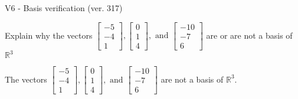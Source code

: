 \begin{exercise}
  \begin{exerciseTitle}V6 - Basis verification (ver. 317)\end{exerciseTitle}
  \begin{exerciseStatement}
    Explain why the vectors \(\left[\begin{array}{r}
-5 \\
-4 \\
1
\end{array}\right] , \left[\begin{array}{r}
0 \\
1 \\
4
\end{array}\right] , \text{ and } \left[\begin{array}{r}
-10 \\
-7 \\
6
\end{array}\right]\) are or are not a basis of \(\mathbb{R}^3\)	


  \end{exerciseStatement}
  \begin{exerciseAnswer}
   The vectors \(\left[\begin{array}{r}
-5 \\
-4 \\
1
\end{array}\right] , \left[\begin{array}{r}
0 \\
1 \\
4
\end{array}\right] , \text{ and } \left[\begin{array}{r}
-10 \\
-7 \\
6
\end{array}\right]\) 
  	 are not  a basis of \(\mathbb{R}^3\).
  


  \end{exerciseAnswer}
\end{exercise}